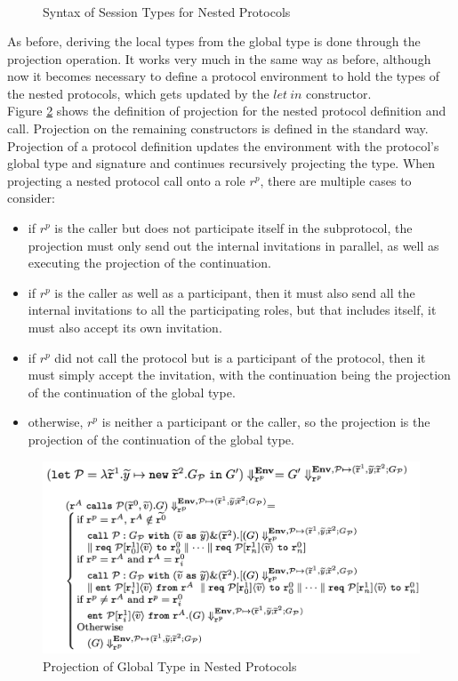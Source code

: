 \documentclass[12pt,twoside]{report}
\begin{document}
\begin{figure}[h]
\begin{equation*}
\begin{array}{rrlr}
        \end{array}
    \end{equation*}
    \caption{Syntax of Session Types for Nested Protocols}
    \label{nested_session_types}
\end{figure}{}

As before, deriving the local types from the global type is done through the projection operation. It works very much in the same way as before, although now it becomes necessary to define a protocol environment to hold the types of the nested protocols, which gets updated by the $let\ in$ constructor.\\ 

Figure \ref{nested_session_projection} shows the definition of projection for the nested protocol definition and call. Projection on the remaining constructors is defined in the standard way. Projection of a protocol definition updates the environment with the protocol's global type and signature and continues recursively projecting the type. When projecting a nested protocol call onto a role $r^p$, there are multiple cases to consider:
\begin{itemize}
    \item if $r^p$ is the caller but does not participate itself in the subprotocol, the projection must only send out the internal invitations in parallel, as well as executing the projection of the continuation.
    \item if $r^p$ is the caller as well as a participant, then it must also send all the internal invitations to all the participating roles, but that includes itself, it must also accept its own invitation.
    \item if $r^p$ did not call the protocol but is a participant of the protocol, then it must simply accept the invitation, with the continuation being the projection of the continuation of the global type.
    \item otherwise, $r^p$ is neither a participant or the caller, so the projection is the projection of the continuation of the global type.
\end{itemize}

\begin{figure}[h]
    \centering
    \includegraphics[scale=0.45]{nested_session_projection.png}
    \caption{Projection of Global Type in Nested Protocols\cite{nestedprotocols}}
    \label{nested_session_projection}
\end{figure}{}
\end{document}
